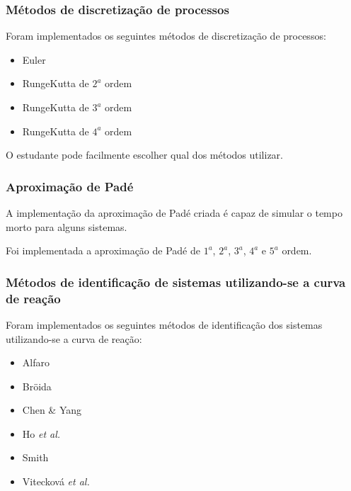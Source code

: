         \subsubsection{Métodos de discretização de processos}

            Foram implementados os seguintes métodos de discretização de processos:

            \begin{itemize}
                \item Euler
                \item RungeKutta de $2^a$ ordem
                \item RungeKutta de $3^a$ ordem
                \item RungeKutta de $4^a$ ordem
            \end{itemize}

            O estudante pode facilmente escolher qual dos métodos utilizar.

        \subsubsection{Aproximação de Padé}
            
            A implementação da aproximação de Padé criada é capaz de simular o tempo morto
            para alguns sistemas.

            Foi implementada a aproximação de Padé de $1^a$, $2^a$, $3^a$, $4^a$ e $5^a$ ordem.

        \subsubsection{Métodos de identificação de sistemas utilizando-se a curva de reação}
            
            Foram implementados os seguintes métodos de identificação dos sistemas utilizando-se
            a curva de reação:

            \begin{itemize}
                \item Alfaro
                \item Bröida
                \item Chen \& Yang
                \item Ho \textit{et al.}
                \item Smith
                \item Vitecková \textit{et al.}
            \end{itemize}

